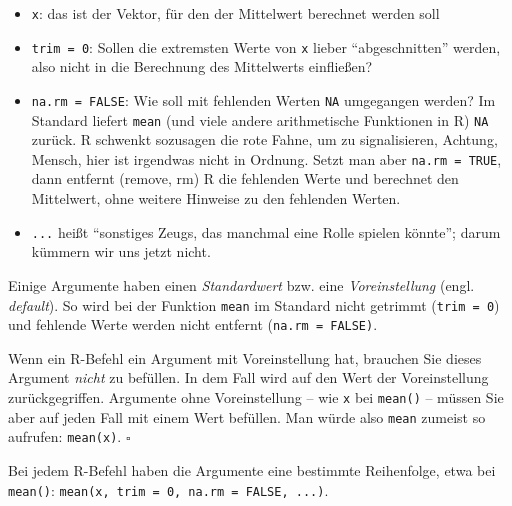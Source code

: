 \documentclass[
  letterpaper,
]{scrbook}
\providecommand{\tightlist}{%
  \setlength{\itemsep}{0pt}\setlength{\parskip}{0pt}}\usepackage{longtable,booktabs,array}
\theoremstyle{definition}
\theoremstyle{definition}
\theoremstyle{definition}
\theoremstyle{remark}
\begin{document}
\begin{itemize}
\tightlist
\item
  \texttt{x}: das ist der Vektor, für den der Mittelwert berechnet
  werden soll
\item
  \texttt{trim\ =\ 0}: Sollen die extremsten Werte von \texttt{x} lieber
  ``abgeschnitten'' werden, also nicht in die Berechnung des Mittelwerts
  einfließen?
\item
  \texttt{na.rm\ =\ FALSE}: Wie soll mit fehlenden Werten \texttt{NA}
  umgegangen werden? Im Standard liefert \texttt{mean} (und viele andere
  arithmetische Funktionen in R) \texttt{NA} zurück. R schwenkt
  sozusagen die rote Fahne, um zu signalisieren, Achtung, Mensch, hier
  ist irgendwas nicht in Ordnung. Setzt man aber
  \texttt{na.rm\ =\ TRUE}, dann entfernt (remove, rm) R die fehlenden
  Werte und berechnet den Mittelwert, ohne weitere Hinweise zu den
  fehlenden Werten.
\item
  \texttt{...} heißt ``sonstiges Zeugs, das manchmal eine Rolle spielen
  könnte''; darum kümmern wir uns jetzt nicht.
\end{itemize}

Einige Argumente haben einen \emph{Standardwert} bzw. eine
\emph{Voreinstellung} (engl. \emph{default}). So wird bei der Funktion
\texttt{mean} im Standard nicht getrimmt (\texttt{trim\ =\ 0}) und
fehlende Werte werden nicht entfernt (\texttt{na.rm\ =\ FALSE)}.

\begin{tcolorbox}[enhanced jigsaw, colbacktitle=quarto-callout-note-color!10!white, coltitle=black, bottomrule=.15mm, rightrule=.15mm, arc=.35mm, toptitle=1mm, colframe=quarto-callout-note-color-frame, opacitybacktitle=0.6, left=2mm, leftrule=.75mm, breakable, opacityback=0, bottomtitle=1mm, titlerule=0mm, title=\textcolor{quarto-callout-note-color}{\faInfo}\hspace{0.5em}{Hinweis}, colback=white, toprule=.15mm]

Wenn ein R-Befehl ein Argument mit Voreinstellung hat, brauchen Sie
dieses Argument \emph{nicht} zu befüllen. In dem Fall wird auf den Wert
der Voreinstellung zurückgegriffen. Argumente ohne Voreinstellung -- wie
\texttt{x} bei \texttt{mean()} -- müssen Sie aber auf jeden Fall mit
einem Wert befüllen. Man würde also \texttt{mean} zumeist so aufrufen:
\texttt{mean(x)}. \(\square\)

\end{tcolorbox}

Bei jedem R-Befehl haben die Argumente eine bestimmte Reihenfolge, etwa
bei \texttt{mean()}:
\texttt{mean(x,\ trim\ =\ 0,\ na.rm\ =\ FALSE,\ ...)}.
\end{document}
